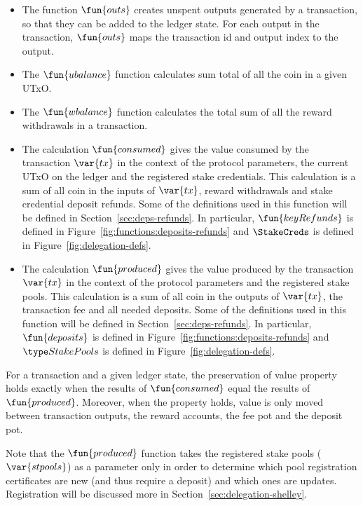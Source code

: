 \begin{itemize}

  \item
    The function $\fun{outs}$ creates unspent outputs generated by a transaction, so that
    they can be added to the ledger state.  For each output in the transaction,
    $\fun{outs}$ maps the transaction id and output index to the output.

  \item
    The $\fun{ubalance}$ function calculates sum total of all the coin in a given UTxO.
  \item
    The $\fun{wbalance}$ function calculates the total sum of all the reward withdrawals in a
    transaction.

  \item The calculation $\fun{consumed}$ gives the value consumed by the
    transaction $\var{tx}$ in the context of the protocol parameters, the
    current UTxO on the ledger and the registered stake credentials. This
    calculation is a sum of all coin in the inputs of $\var{tx}$, reward
    withdrawals and stake credential deposit refunds. Some of the definitions
    used in this function will be defined in Section~\ref{sec:deps-refunds}. In
    particular, $\fun{keyRefunds}$ is defined in
    Figure~\ref{fig:functions:deposits-refunds} and $\StakeCreds$ is defined in
    Figure~\ref{fig:delegation-defs}.

  \item The calculation $\fun{produced}$ gives the value produced by the transaction $\var{tx}$
    in the context of the protocol parameters and the registered stake pools.
    This calculation is a sum of all coin in the outputs of $\var{tx}$,
    the transaction fee and all needed deposits.
    Some of the definitions used in this function will be defined in
    Section~\ref{sec:deps-refunds}.
    In particular, $\fun{deposits}$ is defined in Figure~\ref{fig:functions:deposits-refunds}
    and $\StakePools$ is defined in Figure~\ref{fig:delegation-defs}.
\end{itemize}

For a transaction and a given ledger state, the preservation of value property holds
exactly when the results of $\fun{consumed}$ equal the results of $\fun{produced}$.
Moreover, when the property holds, value is only moved between transaction outputs,
the reward accounts, the fee pot and the deposit pot.

Note that the $\fun{produced}$ function takes the registered stake pools ($\var{stpools}$)
as a parameter only in order to determine which pool registration certificates are
new (and thus require a deposit) and which ones are updates.
Registration will be discussed more in Section~\ref{sec:delegation-shelley}.

